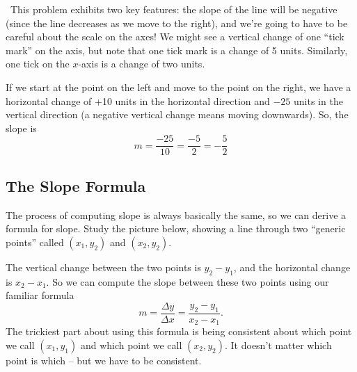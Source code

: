 \begin{boxedex}
\exsoln\ This problem exhibits two key features: the slope of the line will be negative (since the line decreases as we move to the right), and we're going to have to be careful about the scale on the axes! We might see a vertical change of one ``tick mark'' on the axis, but note that one tick mark is a change of 5 units. Similarly, one tick on the $x$-axis is a change of two units.

If we start at the point on the left and move to the point on the right, we have a horizontal change of +10 units in the horizontal direction and $-25$ units in the vertical direction (a negative vertical change means moving downwards). So, the slope is \[m = \frac{-25}{10} = \frac{-5}{2} = -\frac{5}{2}\]
\end{boxedex}

\subsection{The Slope Formula}

The process of computing slope is always basically the same, so we can derive a formula for slope. Study the picture below, showing a line through two ``generic points'' called $(x_1,y_2)$ and $(x_2,y_2)$.

\begin{center}
\end{center}

The vertical change between the two points is $y_2 - y_1$, and the horizontal change is $x_2 - x_1$. So we can compute the slope between these two points using our familiar formula \[m = \frac{\Delta y}{\Delta x} = \frac{y_2 - y_1}{x_2 - x_1}.\] The trickiest part about using this formula is being consistent about which point we call $(x_1, y_1)$ and which point we call $(x_2,y_2)$. It doesn't matter which point is which -- but we have to be consistent.

